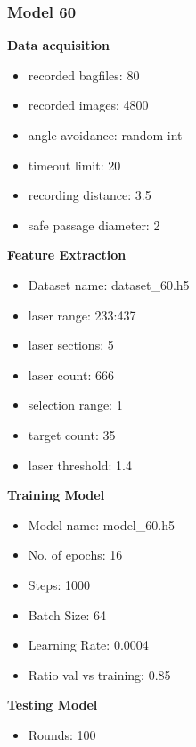 \subsubsection{Model 60\label{model_60} }
\begin{multicols}{2}\textbf{Data acquisition}
\begin{itemize}
\setlength\itemsep{0.1em}
\item recorded bagfiles: 80
\item recorded images: 4800
\item angle avoidance: random int
\item timeout limit: 20
\item recording distance: 3.5
\item safe passage diameter: 2
\end{itemize}
\textbf{Feature Extraction}
\begin{itemize}
\setlength\itemsep{0.1em}
\item Dataset name: dataset\_60.h5
\item  laser range: 233:437
\item  laser sections: 5
\item  laser count: 666
\item  selection range: 1
\item  target count: 35
\item  laser threshold: 1.4
\end{itemize}
\columnbreak\textbf{Training Model}
\begin{itemize}
\setlength\itemsep{0.1em}
\item  Model name: model\_60.h5
\item  No. of epochs: 16
\item  Steps: 1000
\item  Batch Size: 64
\item  Learning Rate: 0.0004
\item  Ratio val vs training: 0.85
\end{itemize}
\textbf{Testing Model}
\begin{itemize}
\setlength\itemsep{0.1em}
\item Rounds: 100
\newline
\newline
\newline
\newline
\newline
\newline
\newline
\newline

\end{itemize}
\end{multicols}
